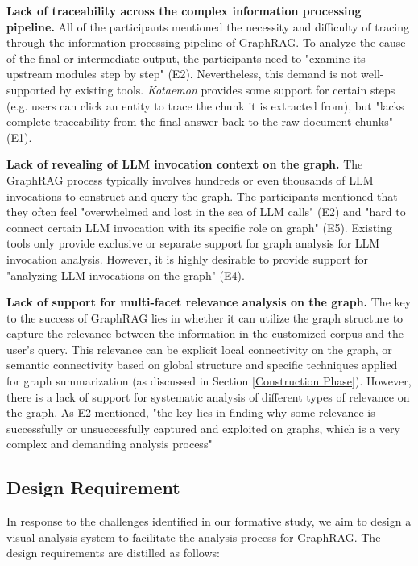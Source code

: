 \textbf{Lack of traceability across the complex information processing pipeline.} All of the participants mentioned the necessity and difficulty of tracing through the information processing pipeline of GraphRAG. To analyze the cause of the final or intermediate output, the participants need to "examine its upstream modules step by step" (E2). Nevertheless, this demand is not well-supported by existing tools. \textit{Kotaemon} \cite{kotaemon} provides some support for certain steps (e.g. users can click an entity to trace the chunk it is extracted from), but "lacks complete traceability from the final answer back to the raw document chunks" (E1).

\textbf{Lack of revealing of LLM invocation context on the graph.} The GraphRAG process typically involves hundreds or even thousands of LLM invocations to construct and query the graph. The participants mentioned that they often feel "overwhelmed and lost in the sea of LLM calls" (E2) and "hard to connect certain LLM invocation with its specific role on graph" (E5). Existing tools only provide exclusive or separate support for graph analysis for LLM invocation analysis. However, it is highly desirable to provide support for "analyzing LLM invocations on the graph" (E4). 

\textbf{Lack of support for multi-facet relevance analysis on the graph.} The key to the success of GraphRAG lies in whether it can utilize the graph structure to capture the relevance between the information in the customized corpus and the user's query. This relevance can be explicit local connectivity on the graph, or semantic connectivity based on global structure and specific techniques applied for graph summarization (as discussed in Section \ref{Construction Phase}). However, there is a lack of support for systematic analysis of different types of relevance on the graph. As E2 mentioned, "the key lies in finding why some relevance is successfully or unsuccessfully captured and exploited on graphs, which is a very complex and demanding analysis process"

\subsection{Design Requirement}

In response to the challenges identified in our formative study, we aim to design a visual analysis system to facilitate the analysis process for GraphRAG. The design requirements are distilled as follows:

